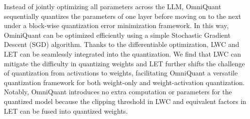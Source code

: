 \documentclass{article} %
\begin{document}
Instead of jointly optimizing all parameters across the LLM, OmniQuant sequentially quantizes the parameters of one layer before moving on to the next under a block-wise quantization error minimization framework. 
%
In this way, 
OminiQuant can be optimized efficiently using a simple Stochastic Gradient Descent (SGD) algorithm. 
%
%
%
%
Thanks to the differentiable optimization, LWC and LET can be seamlessly integrated into the quantization.
We find that LWC can mitigate the difficulty in quantizing weights and LET further shifts the challenge of quantization from activations to weights, facilitating OmniQuant a versatile quantization framework for both weight-only and weight-activation quantization.
Notably, OmniQuant introduces no extra computation or parameters for the quantized model because the clipping threshold in LWC and equivalent factors in LET can be fused into quantized weights.
%
%
\end{document}
